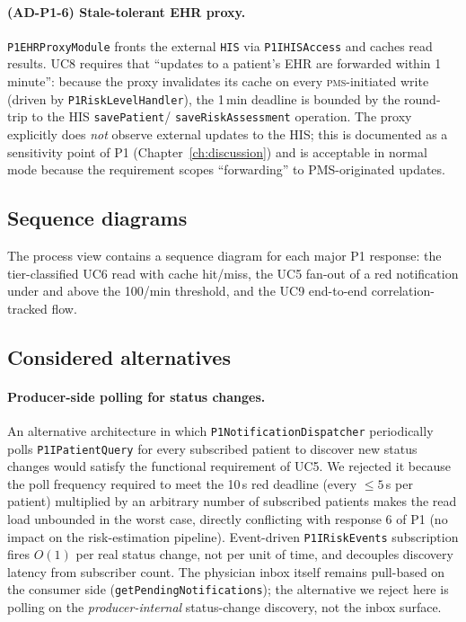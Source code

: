 \paragraph{(AD-P1-6) Stale-tolerant EHR proxy.}
\texttt{P1EHRProxyModule} fronts the external \texttt{HIS} via
\texttt{P1IHISAccess} and caches read results. UC8 requires that
``updates to a patient's EHR are forwarded within 1\,minute'': because
the proxy invalidates its cache on every \textsc{pms}-initiated write
(driven by \texttt{P1RiskLevelHandler}), the 1\,min deadline is bounded
by the round-trip to the HIS \texttt{savePatient}/
\texttt{saveRiskAssessment} operation. The proxy explicitly does
\emph{not} observe external updates to the HIS; this is documented as a
sensitivity point of P1 (Chapter~\ref{ch:discussion}) and is acceptable
in normal mode because the requirement scopes ``forwarding'' to
PMS-originated updates.

\subsection*{Sequence diagrams}
The process view contains a sequence diagram for each major P1 response:
the tier-classified UC6 read with cache hit/miss, the UC5 fan-out of a
red notification under and above the 100/min threshold, and the UC9
end-to-end correlation-tracked flow.

\subsection*{Considered alternatives}

\paragraph{Producer-side polling for status changes.}
An alternative architecture in which \texttt{P1NotificationDispatcher}
periodically polls \texttt{P1IPatientQuery} for every subscribed patient
to discover new status changes would satisfy the functional requirement
of UC5. We rejected it because the poll frequency required to meet the
10\,s red deadline (every $\leq 5$\,s per patient) multiplied by an
arbitrary number of subscribed patients makes the read load unbounded
in the worst case, directly conflicting with response 6 of P1 (no
impact on the risk-estimation pipeline). Event-driven \texttt{P1IRiskEvents}
subscription fires $O(1)$ per real status change, not per unit of time,
and decouples discovery latency from subscriber count. The physician
inbox itself remains pull-based on the consumer side
(\texttt{getPendingNotifications}); the alternative we reject here is
polling on the \emph{producer-internal} status-change discovery, not
the inbox surface.

